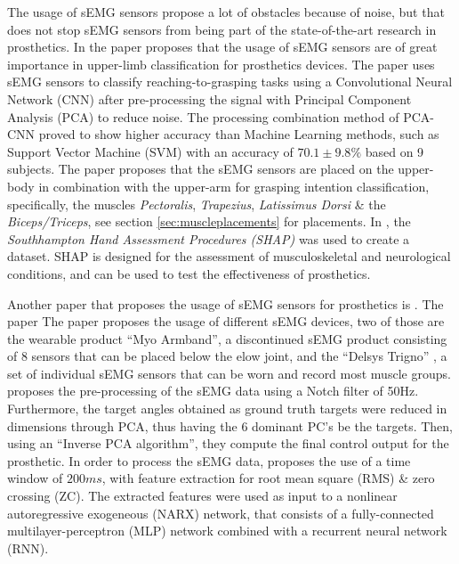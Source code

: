 \documentclass[../main.tex]{subfiles}
\begin{document}
The usage of sEMG sensors propose a lot of obstacles because of noise, but that does not stop sEMG sensors from being part of the state-of-the-art research in prosthetics.
In the paper \cite{KeunTaeKim2021} proposes that the usage of sEMG sensors are of great importance in upper-limb classification for prosthetics devices.
The paper uses sEMG sensors to classify reaching-to-grasping tasks using  a Convolutional Neural Network (CNN) after pre-processing the signal with Principal Component Analysis (PCA) to reduce noise.
The processing combination method of PCA-CNN proved to show higher accuracy than Machine Learning methods, such as Support Vector Machine (SVM) with an accuracy of $70.1 \pm 9.8\%$ based on 9 subjects.
The paper proposes that the sEMG sensors are placed on the upper-body in combination with the upper-arm for grasping intention classification, specifically, the muscles \textit{Pectoralis}, \textit{Trapezius}, \textit{Latissimus Dorsi} \& the \textit{Biceps/Triceps}, see section \ref{sec:muscleplacements} for placements.
In \cite{KeunTaeKim2021}, the \textit{Southhampton Hand Assessment Procedures (SHAP)} \cite{shap} was used to create a dataset.
SHAP is designed for the assessment of musculoskeletal and neurological conditions, and can be used to test the effectiveness of prosthetics.

Another paper that proposes the usage of sEMG sensors for prosthetics is \cite{Zhaolong2021}.
The paper
The paper proposes the usage of different sEMG devices, two of those are the wearable product ``Myo Armband'', \cite{myo} a discontinued sEMG product consisting of 8 sensors that can be placed below the elow joint, and the ``Delsys Trigno'' \cite{trigno}, a set of individual sEMG sensors that can be worn and record most muscle groups.
\cite{Zhaolong2021} proposes the pre-processing of the sEMG data using a Notch filter of 50Hz.
Furthermore, the target angles obtained as ground truth targets were reduced in dimensions through PCA, thus having the 6 dominant PC's be the targets.
Then, using an ``Inverse PCA algorithm'', they compute the final control output for the prosthetic.
In order to process the sEMG data, \cite{Zhaolong2021} proposes the use of a time window of $200ms$, with feature extraction for root mean square (RMS) \& zero crossing (ZC).
The extracted features were used as input to a nonlinear autoregressive exogeneous (NARX) network, that consists of a fully-connected multilayer-perceptron (MLP) network combined with a recurrent neural network (RNN). 
\end{document}
